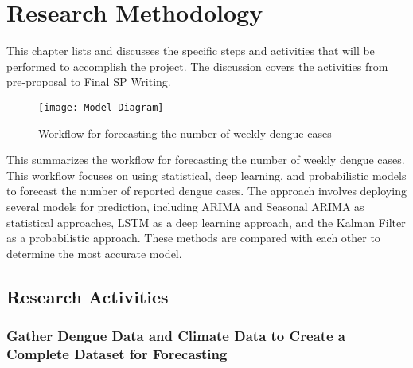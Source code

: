 \chapter{Research Methodology}
This chapter lists and discusses the specific steps and activities that will be performed to accomplish the project. 
The discussion covers the activities from pre-proposal to Final SP Writing.

\begin{figure}[ht]
	\centering
	\texttt{[image: Model Diagram]}
	\caption{Workflow for forecasting the number of weekly dengue cases}
	\label{fig:data_snippet}
\end{figure}
This summarizes the workflow for forecasting the number of weekly dengue cases. This workflow focuses on using statistical, deep learning, and probabilistic models to forecast the number of reported dengue cases. The approach involves deploying several models for prediction, including ARIMA and Seasonal ARIMA as statistical approaches, LSTM as a deep learning approach, and the Kalman Filter as a probabilistic approach. These methods are compared with each other to determine the most accurate model.
\section{Research Activities}

\subsection{Gather Dengue Data and Climate Data to Create a Complete Dataset for Forecasting}

